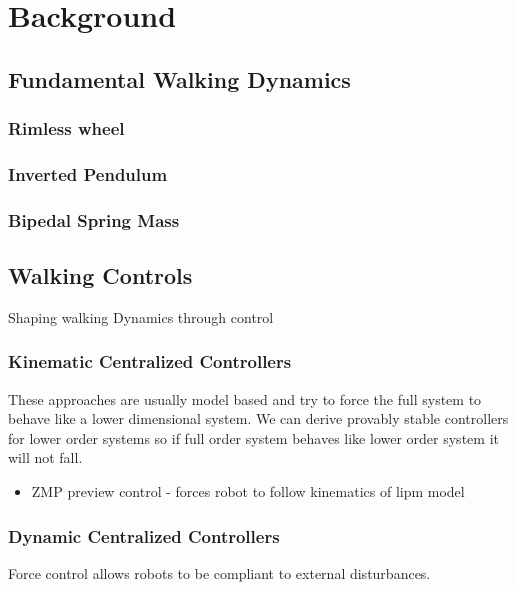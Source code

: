 \chapter{Background}

\section{Fundamental Walking Dynamics}
\subsection{Rimless wheel}
\subsection{Inverted Pendulum}
\subsection{Bipedal Spring Mass}

\section{Walking Controls}

Shaping walking Dynamics through control
\subsection{Kinematic Centralized Controllers}

These approaches are usually model based and try to force the full system to
behave like a lower dimensional system. We can derive provably stable
controllers for lower order systems so if full order system behaves like lower
order system it will not fall.


    \begin{itemize}
        \item ZMP preview control - forces robot to follow kinematics of lipm
        model
    \end{itemize}

\subsection{Dynamic Centralized Controllers}
    Force control allows robots to be compliant to external disturbances.

